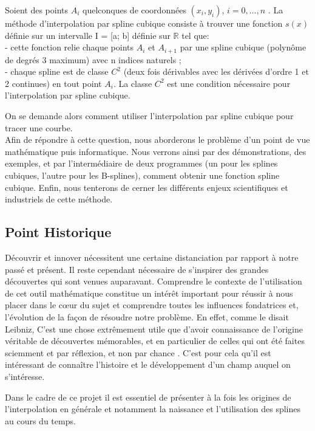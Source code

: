 \documentclass{article}
\begin{document}
	Soient des points $A_i$ quelconques de coordonn\'{e}es $(x_i , y_i )$, $i = 0, …,n$ . La m\'{e}thode d'interpolation par spline cubique consiste \`{a} trouver une fonction $s(x)$ d\'{e}finie sur un intervalle I = [a; b] d\'{e}finie sur $\mathbb{R}$ tel que:
\\
- cette fonction relie chaque points $A_i $ et $A_{ i+1}$ par une spline cubique (polyn\^{o}me de degr\'{e}s 3 maximum) avec n indices naturels ;
\\
- chaque spline est de classe $C^2$ (deux fois d\'{e}rivables avec les d\'{e}riv\'{e}es d'ordre 1 et 2 continues) en tout point $A_i$. La classe $C^2$ est une condition n\'{e}cessaire pour l'interpolation par spline cubique.
\par    
	On se demande alors comment utiliser l'interpolation par spline cubique pour tracer une courbe.
\\
\indent
	Afin de r\'{e}pondre \`{a} cette question, nous aborderons le probl\`{e}me d'un point de vue math\'{e}matique puis informatique. Nous verrons ainsi par des d\'{e}monstrations, des exemples, et par l'interm\'{e}diaire de deux programmes (un pour les splines cubiques, l'autre pour les B-splines), comment obtenir une fonction spline cubique. Enfin, nous tenterons de cerner les diff\'{e}rents enjeux scientifiques et industriels de cette m\'{e}thode.

\subsection{Point Historique}

	D\'{e}couvrir et innover n\'{e}cessitent une certaine distanciation par rapport \`{a} notre pass\'{e} et pr\'{e}sent. Il reste cependant n\'{e}cessaire de s'inspirer des grandes d\'{e}couvertes qui sont venues auparavant. Comprendre le contexte de l'utilisation de cet outil math\'{e}matique constitue un int\'{e}r\^{e}t important pour r\'{e}ussir \`{a} nous placer dans le c\oe{}ur du sujet et comprendre toutes les influences fondatrices et, l'\'{e}volution de la fa\c con de r\'{e}soudre notre probl\`{e}me. En effet, comme le disait Leibniz, \guillemotleft C'est une chose extr\^{e}mement utile que d'avoir connaissance de l'origine v\'{e}ritable de d\'{e}couvertes m\'{e}morables, et en particulier de celles qui ont \'{e}t\'{e} faites sciemment et par r\'{e}flexion, et non par chance \guillemotright. C'est pour cela qu'il est int\'{e}ressant de conna\^{i}tre l'histoire et le d\'{e}veloppement d'un champ auquel on s'int\'{e}resse.
\par
	Dans le cadre de ce projet il est essentiel de pr\'{e}senter \`{a} la fois les origines de l'interpolation en g\'{e}n\'{e}rale et notamment la naissance et l'utilisation des splines au cours du temps.
\end{document}
